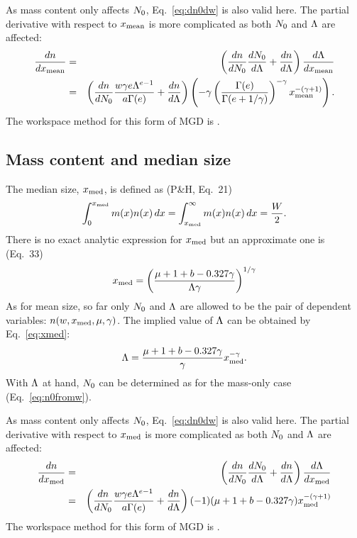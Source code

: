 As mass content only affects $N_0$, Eq.~\ref{eq:dn0dw} is also valid here. The
partial derivative with respect to $x_\mathrm{mean}$ is more complicated as both $N_0$
and $\Lambda$ are affected:
\begin{eqnarray}
  \frac{dn}{dx_\mathrm{mean}} &=& \left( \frac{dn}{dN_0}\frac{dN_0}{d\Lambda} + 
                        \frac{dn}{d\Lambda} \right) \frac{d\Lambda}{dx_\mathrm{mean}} \nonumber\\
 &=& \left( \frac{dn}{dN_0} \frac{w\gamma e\Lambda^{e-1}}{a\Gamma(e)} + 
                        \frac{dn}{d\Lambda} \right) \left(-\gamma \left( \frac{\Gamma(e)}{\Gamma(e+1/\gamma)}\right)^{-\gamma}  x_\mathrm{mean}^{-(\gamma+1)}\right).
\end{eqnarray}
The workspace method for this form of MGD is .



\subsection{Mass content and median size}
%
The median size, $x_\mathrm{med}$, is defined as (P\&H, Eq.~21)
\begin{equation}
  \int_0^{x_\mathrm{med}} m(x) n(x)\, dx= \int_{x_\mathrm{med}}^\infty m(x) n(x)\, dx= \frac{W}{2}.
\end{equation}
There is no exact analytic expression for $x_\mathrm{med}$ but an approximate one is (Eq.~33)
\begin{equation}
  x_\mathrm{med} = \left( \frac{\mu+1+b-0.327\gamma}{\Lambda\gamma} \right)^{1/\gamma}
  \label{eq:xmed}
\end{equation}
As for mean size, so far only $N_0$ and $\Lambda$ are allowed to be the pair of
dependent variables: $n(w,x_\mathrm{med},\mu,\gamma)$. The implied value of $\Lambda$ can be
obtained by Eq.~\ref{eq:xmed}:
\begin{equation}
  \Lambda = \frac{\mu+1+b-0.327\gamma}{\gamma}x_\mathrm{med}^{-\gamma}. 
\end{equation}
With $\Lambda$ at hand, $N_0$ can be determined as for the mass-only case
(Eq.~\ref{eq:n0fromw}).

As mass content only affects $N_0$, Eq.~\ref{eq:dn0dw} is also valid here. The
partial derivative with respect to $x_\mathrm{med}$ is more complicated as both $N_0$
and $\Lambda$ are affected:
\begin{eqnarray}
  \frac{dn}{dx_\mathrm{med}} &=& \left( \frac{dn}{dN_0}\frac{dN_0}{d\Lambda} + 
                        \frac{dn}{d\Lambda} \right) \frac{d\Lambda}{dx_\mathrm{med}} \nonumber\\
 &=& \left( \frac{dn}{dN_0} \frac{w\gamma e\Lambda^{e-1}}{a\Gamma(e)} + 
                        \frac{dn}{d\Lambda} \right) (-1)(\mu+1+b-0.327\gamma)x_\mathrm{med}^{-(\gamma+1)} 
\end{eqnarray}
The workspace method for this form of MGD is .



